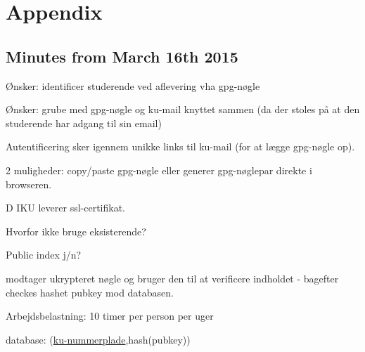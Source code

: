 \documentclass[11pt,a4paper]{report}
\let\OldItem\item
\newcommand{\SubItemStart}[1]{%
    \let\item\SubItemEnd
    \begin{SubItemList}[resume]%
        \OldItem #1%
}
\newcommand{\SubItemMiddle}[1]{%
    \OldItem #1%
}
\newcommand{\SubItemEnd}[1]{%
    \end{SubItemList}%
    \let\item\OldItem
    \item #1%
}
\newcommand*{\SubItem}[1]{%
    \let\SubItem\SubItemMiddle%
    \SubItemStart{#1}%
}%
\begin{document}
%
%
%
%
%
%
%
%
%
%
%
%

\newpage
\section{Appendix}
\subsection{Minutes from March 16th 2015}
\begin{itemize}
\item Ønsker: identificer studerende ved aflevering vha gpg-nøgle
\item Ønsker: grube med gpg-nøgle og ku-mail knyttet sammen (da der stoles på at den studerende har adgang til sin email)
\item Autentificering sker igennem unikke links til ku-mail (for at lægge gpg-nøgle op).
\SubItem 2 muligheder: copy/paste gpg-nøgle eller generer gpg-nøglepar direkte i browseren.
\item DIKU leverer ssl-certifikat.
\item Hvorfor ikke bruge eksisterende?
\item Public index j/n?
\item modtager ukrypteret nøgle og bruger den til at verificere indholdet - bagefter checkes hashet pubkey mod databasen.
\item Arbejdsbelastning: 10 timer per person per uger
\item database: (\underline{ku-nummerplade},hash(pubkey))
\end{itemize}
\end{document}
